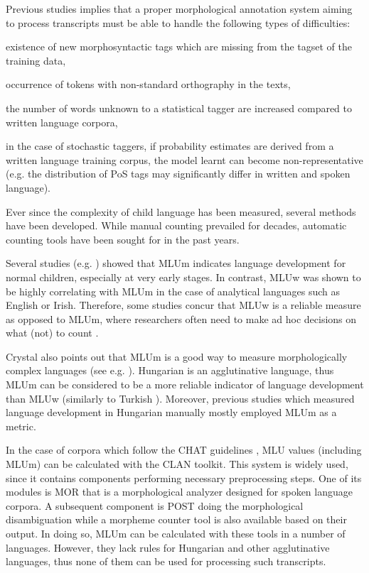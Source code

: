 Previous studies implies that a proper morphological annotation system aiming to process transcripts must be able to handle the following types of difficulties:
\begin{inparaenum}
 \item existence of  new morphosyntactic tags which are missing from the tagset of the training data,
 \item occurrence of tokens with non-standard orthography in the texts,
 \item the number of words unknown to a statistical tagger are increased compared to written language corpora,
 \item in the case of stochastic taggers, if probability estimates are derived from a written language training corpus, the model learnt can become non-representative (e.g. the distribution of PoS tags may significantly differ in written and spoken language).
\end{inparaenum}

Ever since the complexity of child language has been measured, several methods have been developed. While manual counting prevailed for decades, automatic counting tools have been sought for in the past years.

Several studies (e.g. \cite{Brown1973}) showed that MLUm indicates language development for normal children, especially at very early stages. In contrast, MLUw was shown to be highly correlating \cite{Hickey1991,Parker2005} with MLUm in the case of analytical languages such as English or Irish. Therefore, some studies concur that MLUw is a reliable measure as opposed to MLUm, where researchers often need to make ad hoc decisions on what (not) to count \cite{Crystal1974}. 

Crystal also points out \cite{Crystal1974} that MLUm is a good way to measure morphologically complex languages (see e.g. \cite{Bowerman1973}). Hungarian is an agglutinative language, thus MLUm can be considered to be a more reliable indicator of language development  than MLUw (similarly to Turkish \cite{saygin2010}). 
Moreover, previous studies which measured language development in Hungarian manually \cite{Reger1990,Weber2011} mostly employed MLUm as a metric.

In the case of corpora which follow the CHAT guidelines \cite{macwhinney1991childes}, MLU values (including MLUm) can be calculated with the CLAN \cite{MacWhinney1992} toolkit. This system is widely used, since it contains components performing necessary preprocessing steps. One of its modules is MOR that is a morphological analyzer designed for spoken language corpora. A subsequent component is POST doing the morphological disambiguation while a morpheme counter tool is also available based on their output. 
In doing so, MLUm can be calculated with these tools in a number of languages.
However, they lack rules for Hungarian and other agglutinative languages, thus none of them can be used for processing such transcripts.

